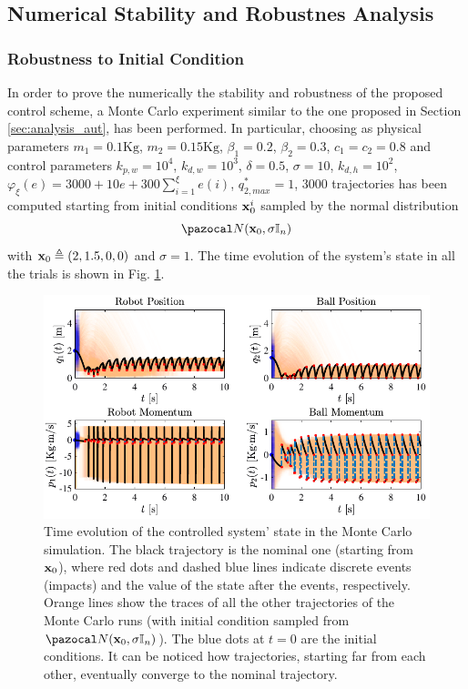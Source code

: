 \subsection{Numerical Stability and Robustnes Analysis}
%
\subsubsection{Robustness to Initial Condition}
In order to prove the numerically the stability and robustness of the proposed control scheme, a Monte Carlo experiment similar to the one proposed in Section \ref{sec:analysis_aut}, has been performed. In particular, choosing as physical parameters $m_1=0.1\text{Kg}$, $m_2=0.15\text{Kg}$, $\beta_1=0.2$, $\beta_2=0.3$, $c_1=c_2=0.8$ and control parameters $k_{p,w} = 10^4$, $k_{d,w} = 10^3$, $\delta = 0.5$, $\sigma = 10$, $k_{d,h} = 10^2$, $\varphi_\xi(e) = 3000 + 10e + 300\sum_{i = 1}^{\xi}e(i)$, $q_{2,max}^* = 1$, 3000 trajectories has been computed starting from initial conditions $\mathbf{x}_0^i$ sampled by the normal distribution
%
\begin{equation}
    \N(\xb_0,\sigma\mathbb{I}_n)
\end{equation}
%
with $\mathbf{x}_0\triangleq(2,1.5,0,0)$ and $\sigma=1$. The time evolution of the system's state in all the trials is shown in Fig. \ref{fig:reg1}.
%
\begin{figure}[h]
    \centering
    \includegraphics[width = \linewidth]{Figures/reg1.pdf}
    \caption[Time evolution of the controlled system' state in the Monte Carlo simulation]{Time evolution of the controlled system' state in the Monte Carlo simulation. The black trajectory is the nominal one (starting from $\mathbf{x}_0$), where red dots and dashed blue lines indicate discrete events (impacts) and the value of the state after the events, respectively. Orange lines show the traces of all the other trajectories of the Monte Carlo runs (with initial condition sampled from $\N(\xb_0,\sigma\mathbb{I}_n)$). The blue dots at $t=0$ are the initial conditions. It can be noticed how trajectories, starting far from each other, eventually converge to the nominal trajectory.}
    \label{fig:reg1}
\end{figure}
